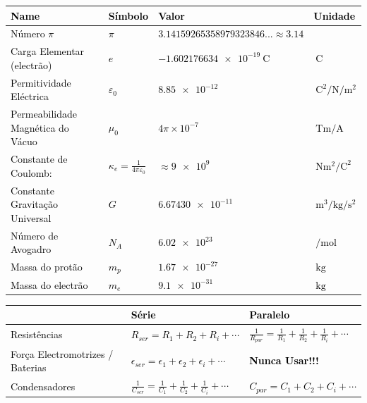\documentclass[a4paper,10pt]{extarticle} %
\newcommand{\mybox}[2]{
    \begin{tcolorbox}[colback=lightblue!5!white,colframe=lightblue!75!black,boxsep=1pt,arc=0pt,outer arc=0pt,title={\textcolor{black}{#1}}]
        \textcolor{black}{#2}
    \end{tcolorbox}
}
\begin{document}
\fontsize{7pt}{8pt}\selectfont
\mybox{Constantes Físicas}{
\begin{tabular}{||l|lll||}
\hline
{\bf Name}&{\bf Símbolo}&{\bf Valor}&{\bf Unidade}\\
\hline\hline
Número $\pi$                 &$\pi$& $ 3.14159265358979323846...\approx 3.14 $ &\\
Carga Elementar (electrão)           &$e$& $\SI{-1.602176634e-19}{\coulomb}$& $\SI{}{\coulomb}$\\
Permitividade Eléctrica & $\varepsilon_0$ & $\SI{8.85e-12}{}$ & $\SI{}{\coulomb\squared\per\newton\per\meter\squared}$\\
Permeabilidade Magnética do Vácuo & $\mu_0$ &  $4 \pi \times 10^{-7}$ & $\SI{}{\tesla\meter\per\ampere}$\\
Constante de Coulomb:  & $\kappa_e =\frac{1}{4\pi\varepsilon_0}$ & 
    $\approx \SI{9e9}{}$ & $\SI{}{\newton\meter\squared\per\coulomb\squared}$\\
Constante Gravitação Universal & $G$ & $\SI{6.67430e-11}{}$ & $\SI{}{\meter\cubed\per\kilogram\per\second\squared}$\\
Número de Avogadro &$N_A$ & $\SI{6.02e23}{}$ &$\SI{}{\per\mole}$\\ 
Massa do protão &$m_p$ & $\SI{1.67e-27}{}$ &$\SI{}{\kilogram}$\\ 
Massa do electrão &$m_e$ & $\SI{9.1e-31}{}$ &$\SI{}{\kilogram}$\\ 
\hline
\end{tabular}
}

\mybox{Associações de Componentes}{
    \begin{tabular}{||l|l|l||}
        \hline & {\bf Série} &{\bf Paralelo}\\
        \hline  Resistências & $ R_{ser} = R_1 + R_2 + R_i  + \cdots $ & $\frac{1}{R_{par}} = \frac{1}{R_1} +\frac{1}{R_2}+\frac{1}{R_i}+ \cdots$ \\ 
        \hline  Força Electromotrizes / Baterias & $\epsilon_{ser} = \epsilon_1 +\epsilon_2 + \epsilon_i  + \cdots $ & {\bf Nunca Usar!!!}\\ 
        \hline  Condensadores & $\frac{1}{C_{ser}} = \frac{1}{C_1} +\frac{1}{C_2}+\frac{1}{C_i}+ \cdots$ & $ C_{par} = C_1 + C_2 + C_i  + \cdots $ \\ 
        \hline
    \end{tabular}
}
\end{document}
